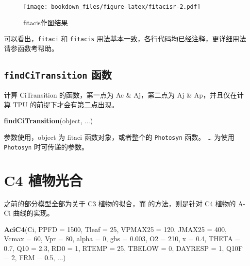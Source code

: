 \documentclass[]{krantz}
\makeatletter
\newenvironment{Shaded}{\begin{snugshade}}{\end{snugshade}}
\newcommand{\KeywordTok}[1]{\textcolor[rgb]{0.13,0.29,0.53}{\textbf{#1}}}
\newcommand{\DataTypeTok}[1]{\textcolor[rgb]{0.13,0.29,0.53}{#1}}
\newcommand{\DecValTok}[1]{\textcolor[rgb]{0.00,0.00,0.81}{#1}}
\newcommand{\FloatTok}[1]{\textcolor[rgb]{0.00,0.00,0.81}{#1}}
\newcommand{\NormalTok}[1]{#1}
\newenvironment{kframe}{%
\medskip{}
\setlength{\fboxsep}{.8em}
 \def\at@end@of@kframe{}%
 \ifinner\ifhmode%
  \def\at@end@of@kframe{\end{minipage}}%
  \begin{minipage}{\columnwidth}%
 \fi\fi%
 \def\FrameCommand##1{\hskip\@totalleftmargin \hskip-\fboxsep
 \colorbox{shadecolor}{##1}\hskip-\fboxsep
     \hskip-\linewidth \hskip-\@totalleftmargin \hskip\columnwidth}%
 \MakeFramed {\advance\hsize-\width
   \@totalleftmargin\z@ \linewidth\hsize
   \@setminipage}}%
 {\par\unskip\endMakeFramed%
 \at@end@of@kframe}
\renewenvironment{Shaded}{\begin{kframe}}{\end{kframe}}
\theoremstyle{definition}
\theoremstyle{definition}
\theoremstyle{definition}
\theoremstyle{remark}
\makeatother
\begin{document}
\begin{figure}
\centering
\texttt{[image: bookdown\_files/figure-latex/fitacisr-2.pdf]}
\caption{\label{fig:fitacisr}fitacis作图结果}
\end{figure}

可以看出，\texttt{fitaci} 和 \texttt{fitacis}
用法基本一致，各行代码均已经注释，更详细用法请参函数考帮助。

\subsection{\texorpdfstring{\texttt{findCiTransition}
函数}{findCiTransition 函数}}\label{findcitransition-}

计算 CiTransition 的函数，第一点为 Ac \& Aj，第二点为 Aj \&
Ap，并且仅在计算 TPU 的前提下才会有第二点出现。

\begin{Shaded}
\begin{Highlighting}[]
\KeywordTok{findCiTransition}\NormalTok{(object, ...)}
\end{Highlighting}
\end{Shaded}

参数使用，object 为 fitaci 函数对象，或者整个的 \texttt{Photosyn} 函数。
\ldots{} 为使用 \texttt{Photosyn} 时可传递的参数。

\section{C4 植物光合}\label{c4-}

之前的部分模型全部为关于 C3 植物的拟合，而
\citet{Caemmerer2000Biochemical} 的方法，则是针对 C4 植物的 A-Ci
曲线的实现。

\begin{Shaded}
\begin{Highlighting}[]
\KeywordTok{AciC4}\NormalTok{(Ci, }\DataTypeTok{PPFD =} \DecValTok{1500}\NormalTok{, }\DataTypeTok{Tleaf =} \DecValTok{25}\NormalTok{, }\DataTypeTok{VPMAX25 =} \DecValTok{120}\NormalTok{, }
      \DataTypeTok{JMAX25 =} \DecValTok{400}\NormalTok{, }\DataTypeTok{Vcmax =} \DecValTok{60}\NormalTok{, }\DataTypeTok{Vpr =} \DecValTok{80}\NormalTok{, }
      \DataTypeTok{alpha =} \DecValTok{0}\NormalTok{, }\DataTypeTok{gbs =} \FloatTok{0.003}\NormalTok{, }\DataTypeTok{O2 =} \DecValTok{210}\NormalTok{, }
      \DataTypeTok{x =} \FloatTok{0.4}\NormalTok{, }\DataTypeTok{THETA =} \FloatTok{0.7}\NormalTok{, }\DataTypeTok{Q10 =} \FloatTok{2.3}\NormalTok{, }
      \DataTypeTok{RD0 =} \DecValTok{1}\NormalTok{, }\DataTypeTok{RTEMP =} \DecValTok{25}\NormalTok{, }\DataTypeTok{TBELOW =} \DecValTok{0}\NormalTok{, }
      \DataTypeTok{DAYRESP =} \DecValTok{1}\NormalTok{, }\DataTypeTok{Q10F =} \DecValTok{2}\NormalTok{, }\DataTypeTok{FRM =} \FloatTok{0.5}\NormalTok{, ...)}
\end{Highlighting}
\end{Shaded}
\end{document}
